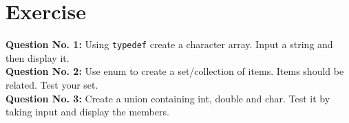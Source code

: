 \documentclass[12pt,a4paper]{article}
\begin{document}
\section{Exercise}
\textbf{Question No. 1:} Using \verb|typedef| create a character array. Input a string and then display it.\\
\textbf{Question No. 2:} Use enum to create a set/collection of items. Items should be related. Test your set.\\
\textbf{Question No. 3:} Create a union containing int, double and char. Test it by taking input and display the members.\\
\end{document}
